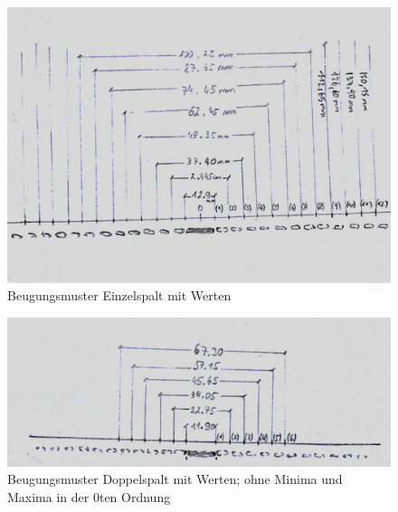 \documentclass[12pt,a4paper]{article}
\begin{document}
\begin{figure}[H]
	\centering
	\includegraphics[scale=0.9]{./figure/einzelspalt_beugung.png}
	\caption{Beugungsmuster Einzelspalt mit Werten}
	\label{fig:messwerte_einzelspalt}
\end{figure}
\begin{figure}[H]
	\centering
	\includegraphics[scale=0.9]{./figure/doppelspalt_beugung.png}
	\caption{Beugungsmuster Doppelspalt mit Werten; ohne Minima und Maxima in der 0ten Ordnung}
	\label{fig:messwerte_doppelspalt}
\end{figure}
\end{document}
